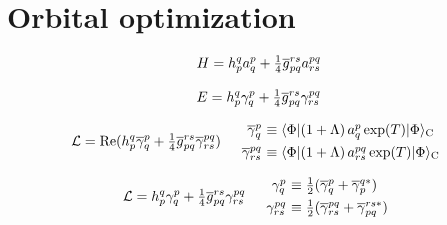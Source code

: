 \documentclass[11pt]{article}
\numberwithin{equation}{section}
\begin{document}
\begin{thm}
\label{thm:frantz-mills-factorization}
\thmproof{
}
\end{thm}



\begin{dfn}
\label{dfn:insertion-graph}
\end{dfn}




\newpage
\section{Orbital optimization}


\begin{align}
  H
=
  h_p^q
  a^p_q
+
  \tfrac{1}{4}
  \overline{g}_{pq}^{rs}
  a^{pq}_{rs}
\end{align}

\begin{align}
  E
=
  h_p^q
  \gamma ^p_q
+
  \tfrac{1}{4}
  \overline{g}_{pq}^{rs}
  \gamma ^{pq}_{rs}
\end{align}

\begin{align}
  \mc{L}
=
  \mr{Re}
  (
    h_p^q
    \ol{\g}^p_q
  +
    \tfr{1}{4}
    \ol{g}_{pq}^{rs}
    \ol{\g}^{pq}_{rs}
  )
&&
\begin{array}{r@{\ }l}
  \ol{\g}^p_q
&\equiv
  \ip{\F|(1+\La)\,a^p_q\,\mr{exp}(T)|\F}_\mr{C}
\\[4pt]
  \ol{\g}^{pq}_{rs}
&\equiv
  \ip{\F|(1+\La)\,a^{pq}_{rs}\,\mr{exp}(T)|\F}_\mr{C}
\end{array}
\end{align}

\begin{align}
  \mc{L}
=
  h_p^q
  \g^p_q
+
  \tfr{1}{4}
  \ol{g}_{pq}^{rs}
  \g^{pq}_{rs}
&&
\begin{array}{r@{\ }l}
  \g^p_q
&\equiv
  \tfr{1}{2}
  (
    \ol{\g}^p_q
  +
    \ol{\g}^{q*}_p
  )
\\[4pt]
  \g^{pq}_{rs}
&\equiv
  \tfr{1}{2}
  (
    \ol{\g}^{pq}_{rs}
  +
    \ol{\g}^{rs*}_{pq}
  )
\end{array}
\end{align}
\end{document}
